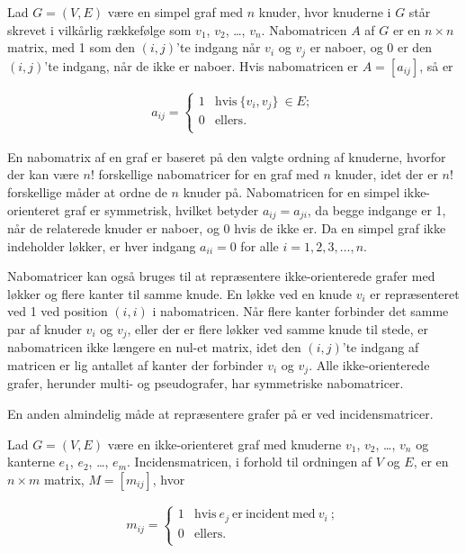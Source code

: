 \begin{defn}
Lad $G=(V,E)$ være en simpel graf med $n$ knuder, hvor knuderne i $G$ står skrevet i vilkårlig rækkefølge som $v_1$, $v_2$, \dots , $v_n$.
Nabomatricen $A$ af $G$ er en $n \times n$ matrix, med 1 som den $(i,j)$’te indgang når $v_i$ og $v_j$ er naboer, og 0 er den $(i,j)$’te indgang, når de ikke er naboer. Hvis nabomatricen er $A=[a_{ij}]$, så er

\begin{align*}
	a_{ij}= \left\{\begin{array}{ll}
	1 & \textrm{hvis} \ \lbrace v_i, v_j \rbrace \ \in E; \\
	0 & \textrm{ellers}.\\
	\end{array}\right.
\end{align*}
\end{defn}

En nabomatrix af en graf er baseret på den valgte ordning af knuderne, hvorfor der kan være $n!$ forskellige nabomatricer for en graf med $n$ knuder, idet der er $n!$ forskellige måder at ordne de $n$ knuder på.
Nabomatricen for en simpel ikke-orienteret graf er symmetrisk, hvilket betyder $a_{ij}=a_{ji}$, da begge indgange er 1, når de relaterede knuder er naboer, og 0 hvis de ikke er.
Da en simpel graf ikke indeholder løkker, er hver indgang $a_{ii}=0$ for alle $i=1,2,3, \dots ,n$. 

Nabomatricer kan også bruges til at repræsentere ikke-orienterede grafer med løkker og flere kanter til samme knude.
En løkke ved en knude $v_i$ er repræsenteret ved 1 ved position $(i,i)$ i nabomatricen.
Når flere kanter forbinder det samme par af knuder $v_i$ og $v_j$, eller der er flere løkker ved samme knude til stede, er nabomatricen ikke længere en nul-et matrix, idet den $(i,j)$’te indgang af matricen er lig antallet af kanter der forbinder $v_i$ og $v_j$.
Alle ikke-orienterede grafer, herunder multi- og pseudografer, har symmetriske nabomatricer.

En anden almindelig måde at repræsentere grafer på er ved incidensmatricer.

\begin{defn}
Lad $G=(V,E)$ være en ikke-orienteret graf med knuderne $v_1$, $v_2$, \dots , $v_n$ og kanterne $e_1$, $e_2$, \dots , $e_m$. Incidensmatricen, i forhold til ordningen af $V$ og $E$, er en $n \times m$ matrix, $M=[m_{ij}]$, hvor 

\begin{align*}
	m_{ij}= \left\{\begin{array}{ll}
	1 & \textrm{hvis} \  {e_j} \  \textrm{er} \  \textrm{incident} \ \textrm{med} \ v_i \ ;\\
	0 & \textrm{ellers}. \\
	\end{array}\right.
\end{align*}
\end{defn}

